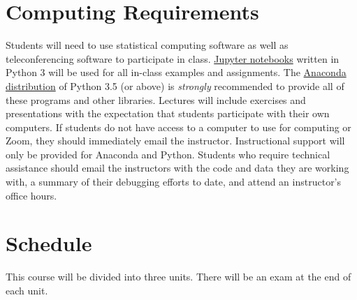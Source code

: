 \documentclass[10pt]{memoir}
\begin{document}
\section{\textbf{Computing Requirements}}
Students will need to use statistical computing software as well as teleconferencing software to participate in class. \href{http://jupyter.org/}{Jupyter notebooks} written in Python 3 will be used for all in-class examples and assignments. The \href{https://www.continuum.io/why-anaconda}{Anaconda distribution} of Python 3.5 (or above) is \textit{strongly} recommended to provide all of these programs and other libraries. Lectures will include exercises and presentations with the expectation that students participate with their own computers. If students do not have access to a computer to use for computing or Zoom, they should immediately email the instructor. Instructional support will only be provided for Anaconda and Python. Students who require technical assistance should email the instructors with the code and data they are working with, a summary of their debugging efforts to date, and attend an instructor's office hours.

\clearpage

\section{\textbf{Schedule}}

This course will be divided into three units. There will be an exam at the end of each unit. \\
\end{document}
